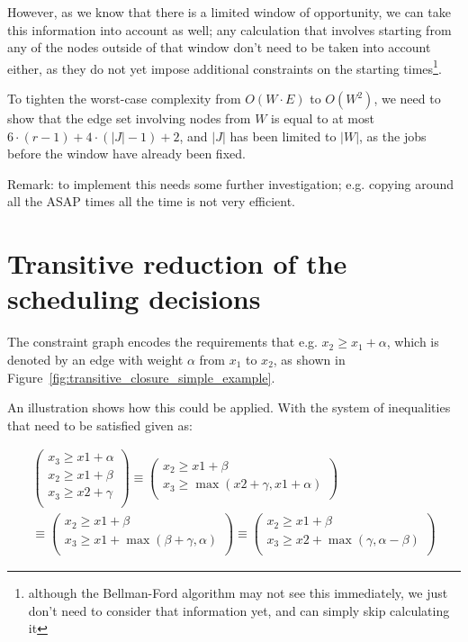 \documentclass[]{article}
\begin{document}
However, as we know that there is a limited window of opportunity, we can take this information into account as well; any calculation that involves starting from any of the nodes outside of that window don't need to be taken into account either, as they do not yet impose additional constraints on the starting times\footnote{although the Bellman-Ford algorithm may not see this immediately, we just don't need to consider that information yet, and can simply skip calculating it}.

To tighten the worst-case complexity from $O(W \cdot E)$ to $O(W^2)$, we need to show that the edge set involving nodes from $W$ is equal to at most $6\cdot (r-1) + 4 \cdot (|J| - 1) + 2$, and $|J|$ has been limited to $|W|$, as the jobs before the window have already been fixed.

Remark: to implement this needs some further investigation; e.g. copying around all the ASAP times all the time is not very efficient.

\section{Transitive reduction of the scheduling decisions}

The constraint graph encodes the requirements that e.g. $x_2 \geq x_1 + \alpha$, which is denoted by an edge with weight $\alpha$ from $x_1$ to $x_2$, as shown in Figure~\ref{fig:transitive_closure_simple_example}.

An illustration shows how this could be applied. With the system of inequalities that need to be satisfied given as:

\begin{align*}
\begin{pmatrix}
x_3 \geq x1 + \alpha\\
x_2 \geq x1 + \beta\\
x_3 \geq x2 + \gamma\\
\end{pmatrix}
\equiv
\begin{pmatrix}
x_2 \geq x1 + \beta\\
x_3 \geq \max{\left(x2 + \gamma, x1 + \alpha\right)}\\
\end{pmatrix}
\\
\equiv
\begin{pmatrix}
x_2 \geq x1 + \beta\\
x_3 \geq x1 + \max{\left(\beta + \gamma, \alpha\right)}\\
\end{pmatrix}
\equiv
\begin{pmatrix}
x_2 \geq x1 + \beta\\
x_3 \geq x2 + \max{\left(\gamma, \alpha - \beta\right)}\\
\end{pmatrix}
\end{align*}
\end{document}
